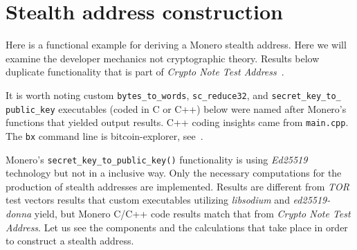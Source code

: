 \section{Stealth address construction} \label{sec:construction}
Here is a functional example for deriving a Monero stealth address. Here we will examine the developer mechanics not cryptographic theory. Results below duplicate functionality that is part of \emph{Crypto Note Test Address}~\cite{teststealth}.

It is worth noting custom \verb|bytes_to_words|, \verb|sc_reduce32|, and \verb|secret_key_to_| \verb|public_key| executables (coded in C or C++) below were named after Monero's functions that yielded output results. C++ coding insights came from \verb|main.cpp|. The \verb|bx| command line is bitcoin-explorer, see~\cite{bx}.

Monero's \verb|secret_key_to_public_key()| functionality is using \emph{Ed25519} technology but not in a inclusive way. Only the necessary computations for the production of stealth addresses are implemented. Results are different from \emph{TOR} test vectors results that custom executables utilizing \emph{libsodium} and \emph{ed25519-donna} yield, but Monero C/C++ code results match that from \emph{Crypto Note Test Address}. Let us see the components and the calculations that take place in order to construct a stealth address.


